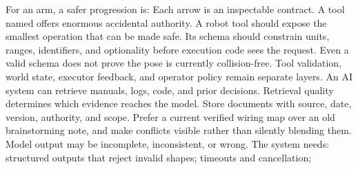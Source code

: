 {}For an arm, a safer progression is:\markdownRendererInterblockSeparator
{}\markdownRendererInterblockSeparator
{}Each arrow is an inspectable contract.\markdownRendererInterblockSeparator
{}
\markdownRendererSectionEnd \markdownRendererSectionBegin
{}\markdownRendererInterblockSeparator
{}A tool named  offers enormous accidental authority. A\markdownRendererSoftLineBreak
{}robot tool should expose the smallest operation that can be made safe. Its\markdownRendererSoftLineBreak
{}schema should constrain units, ranges, identifiers, and optionality before\markdownRendererSoftLineBreak
{}execution code sees the request.\markdownRendererInterblockSeparator
{}\markdownRendererInterblockSeparator
{}Even a valid schema does not prove the pose is currently collision-free. Tool\markdownRendererSoftLineBreak
{}validation, world state, executor feedback, and operator policy remain separate\markdownRendererSoftLineBreak
{}layers.\markdownRendererInterblockSeparator
{}
\markdownRendererSectionEnd \markdownRendererSectionBegin
{}\markdownRendererInterblockSeparator
{}An AI system can retrieve manuals, logs, code, and prior decisions. Retrieval\markdownRendererSoftLineBreak
{}quality determines which evidence reaches the model. Store documents with\markdownRendererSoftLineBreak
{}source, date, version, authority, and scope. Prefer a current verified wiring\markdownRendererSoftLineBreak
{}map over an old brainstorming note, and make conflicts visible rather than\markdownRendererSoftLineBreak
{}silently blending them.\markdownRendererInterblockSeparator
{}
\markdownRendererSectionEnd \markdownRendererSectionBegin
{}\markdownRendererInterblockSeparator
{}Model output may be incomplete, inconsistent, or wrong. The system needs:\markdownRendererInterblockSeparator
{}\markdownRendererUlBegin
\markdownRendererUlItem structured outputs that reject invalid shapes;\markdownRendererUlItemEnd 
\markdownRendererUlItem timeouts and cancellation;\markdownRendererUlItemEnd 
